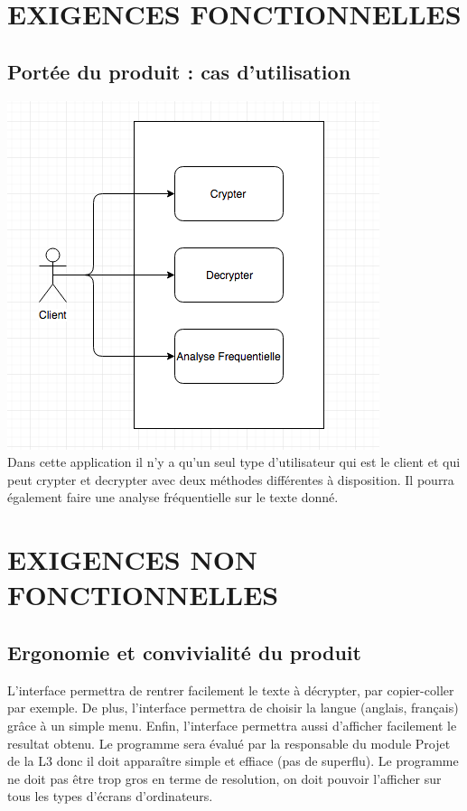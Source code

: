 \documentclass[a4]{article}
\begin{document}
	\section{EXIGENCES FONCTIONNELLES}
		\subsection{Portée du produit : cas d’utilisation}
			\includegraphics[scale=0.35]{dia.png} \\
			Dans cette application il n'y a qu'un seul type d'utilisateur qui est le client 
			et qui peut crypter et decrypter avec deux méthodes différentes à disposition.
			Il pourra également faire une analyse fréquentielle sur le texte donné.
	\section{EXIGENCES NON FONCTIONNELLES}
		\subsection{Ergonomie et convivialité du produit}
				L'interface permettra de rentrer facilement le texte à décrypter, par copier-coller 
				par exemple.
				De plus, l'interface permettra de choisir la langue (anglais, français) grâce à un
				simple menu.
				Enfin, l'interface permettra aussi d'afficher facilement le resultat obtenu.
				Le programme sera évalué par la responsable du module Projet de la L3 donc il doit 
				apparaître simple et effiace (pas de superflu).
				Le programme ne doit pas être trop gros en terme de resolution, on doit pouvoir 
				l'afficher sur 	tous les types d'écrans d'ordinateurs.
\end{document}
